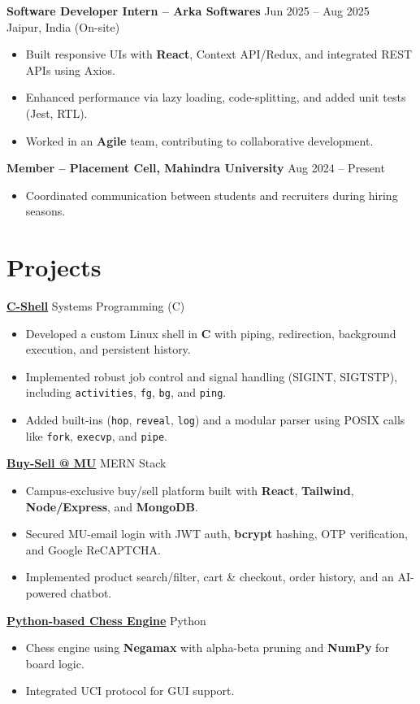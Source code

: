 \documentclass[a4paper,11pt]{article}
\begin{document}
\textbf{Software Developer Intern – Arka Softwares} \hfill Jun 2025 – Aug 2025 \\
Jaipur, India (On-site)
\begin{itemize}
    \item Built responsive UIs with \textbf{React}, Context API/Redux, and integrated REST APIs using Axios.
    \item Enhanced performance via lazy loading, code-splitting, and added unit tests (Jest, RTL).
    \item Worked in an \textbf{Agile} team, contributing to collaborative development.
\end{itemize}


\textbf{Member – Placement Cell, Mahindra University} \hfill Aug 2024 – Present
\begin{itemize}
    \item Coordinated communication between students and recruiters during hiring seasons.
\end{itemize}

\section*{Projects}

\textbf{\uline{C-Shell}} \hfill Systems Programming (C)
\begin{itemize}
    \item Developed a custom Linux shell in \textbf{C} with piping, redirection, background execution, and persistent history.
    \item Implemented robust job control and signal handling (SIGINT, SIGTSTP), including \texttt{activities}, \texttt{fg}, \texttt{bg}, and \texttt{ping}.
    \item Added built-ins (\texttt{hop}, \texttt{reveal}, \texttt{log}) and a modular parser using POSIX calls like \texttt{fork}, \texttt{execvp}, and \texttt{pipe}.
\end{itemize}

\textbf{\uline{Buy-Sell @ MU}} \hfill MERN Stack
\begin{itemize}
    \item Campus-exclusive buy/sell platform built with \textbf{React}, \textbf{Tailwind}, \textbf{Node/Express}, and \textbf{MongoDB}.
    \item Secured MU-email login with JWT auth, \textbf{bcrypt} hashing, OTP verification, and Google ReCAPTCHA.
    \item Implemented product search/filter, cart & checkout, order history, and an AI-powered chatbot.
\end{itemize}


\textbf{\uline{\href{https://github.com/manjaripandey/ChessEngine-.git}{Python-based Chess Engine}}} \hfill Python
\begin{itemize}
    \item Chess engine using \textbf{Negamax} with alpha-beta pruning and \textbf{NumPy} for board logic.
    \item Integrated UCI protocol for GUI support.
\end{itemize}
\end{document}
